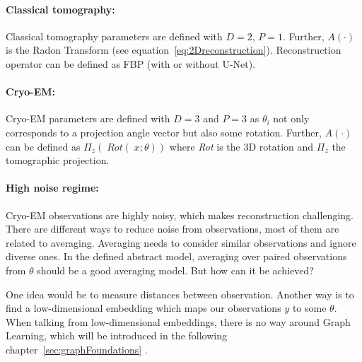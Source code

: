 \paragraph{Classical tomography:}

Classical tomography parameters are defined with $D=2$, $P=1$.
Further, $A(\cdot)$ is the Radon Transform (see equation~\ref{eq:2Dreconstruction}).
Reconstruction operator can be defined as FBP (with or without U-Net\cite{unet-tomography}).

\paragraph{Cryo-EM:}
Cryo-EM parameters are defined with $D=3$ and $P=3$ as $\theta_i$ not only corresponds to
a projection angle vector but also some rotation.
Further, $A(\cdot)$ can be defined as $\Pi_z \left(\; \textit{Rot}(\;x; \theta) \right)$ 
where \textit{Rot} is the 3D rotation and $\Pi_z$ the tomographic projection.

\paragraph{High noise regime:}
Cryo-EM observations are highly noisy, which makes reconstruction challenging. 
There are different ways to reduce noise from observations, most of them are related to averaging. 
Averaging needs to consider similar observations and ignore diverse ones. 
In the defined abstract model, averaging over paired observations from $\theta$ should be a good averaging model.
But how can it be achieved? 

One idea would be to measure distances between observation.
Another way is to find a low-dimensional embedding which maps our observations $y$ to some $\theta$.
When talking from low-dimensional embeddings, there is no way around Graph Learning, which will be introduced
in the following chapter~\ref{sec:graphFoundations} \textit{}.
